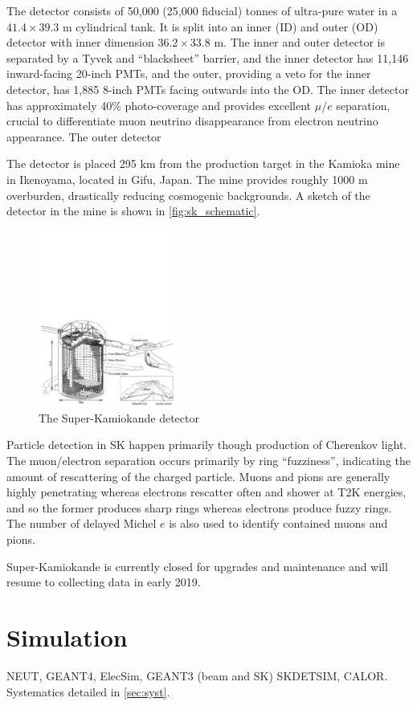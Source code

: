 The detector consists of 50,000 (25,000 fiducial) tonnes of ultra-pure water in a $41.4\times39.3\text{ m}$ cylindrical tank. It is split into an inner (ID) and outer (OD) detector with inner dimension $36.2\times33.8\text{ m}$. The inner and outer detector is separated by a Tyvek and ``blacksheet'' barrier, and the inner detector has 11,146 inward-facing 20-inch PMTs, and the outer, providing a veto for the inner detector, has 1,885 8-inch PMTs facing outwards into the OD. The inner detector has approximately 40\% photo-coverage and provides excellent $\mu/e$ separation, crucial to differentiate muon neutrino disappearance from electron neutrino appearance. The outer detector 

The detector is placed 295 km from the production target in the Kamioka mine in Ikenoyama, located in Gifu, Japan. The mine provides roughly 1000 m overburden, drastically reducing cosmogenic backgrounds. A sketch of the detector in the mine is shown in \autoref{fig:sk_schematic}.
\begin{figure}[h]
	\includegraphics[width=0.4\textwidth, trim={0mm 0mm 0mm 60mm}, clip,page=1]{figures/det_chap/sk/sk.pdf}
	\caption{The Super-Kamiokande detector}
	\label{fig:sk_schematic}
\end{figure}

Particle detection in SK happen primarily though production of Cherenkov light. The muon/electron separation occurs primarily by ring ``fuzziness'', indicating the amount of rescattering of the charged particle. Muons and pions are generally highly penetrating whereas electrons rescatter often and shower at T2K energies, and so the former produces sharp rings whereas electrons produce fuzzy rings. The number of delayed Michel $e$ is also used to identify contained muons and pions.

Super-Kamiokande is currently closed for upgrades and maintenance and will resume to collecting data in early 2019.

\section{Simulation}
NEUT, GEANT4, ElecSim, GEANT3 (beam and SK) SKDETSIM, CALOR. Systematics detailed in \autoref{sec:syst}.

